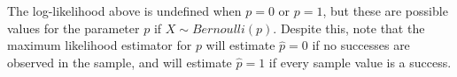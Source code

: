 \par
\noindent\rmk The log-likelihood above is undefined when $p = 0$ or $p=1$, but these are possible values for the parameter $p$ if $X \sim Bernoulli(p)$. Despite this, note that the maximum likelihood estimator for $p$ will estimate $\widehat{p} = 0$ if no successes are observed in the sample, and will estimate $\widehat{p} = 1$ if every sample value is a success.


